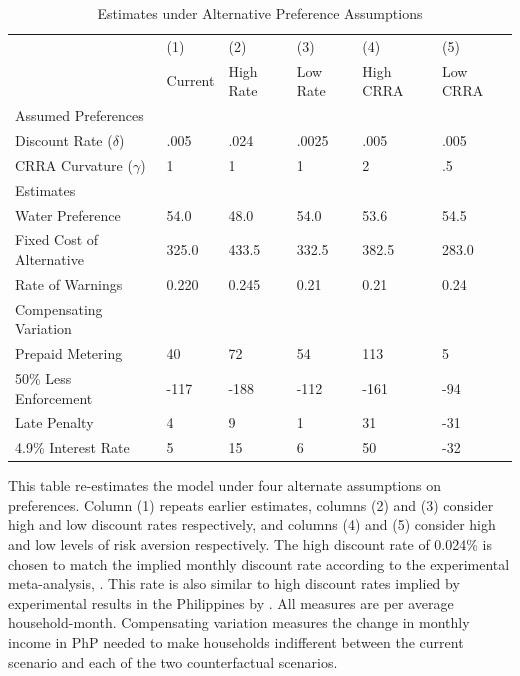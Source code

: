 \documentclass[12pt]{article}
\begin{document}
\begin{table}[H]
\centering
\caption{Estimates under Alternative Preference Assumptions}\label{table:robustestimates}
\begin{threeparttable}
\begin{tabular}{@{}l*{1}{FFFFF}@{}}
\toprule
& (1) & (2) & (3) & (4) & (5) \\
   & Current & High Rate & Low Rate & High CRRA &  Low CRRA \\[.2em]
\midrule   
Assumed Preferences\\
\hspace{1em}Discount Rate ($\delta$)  & .005  & .024 & .0025  & .005 & .005     \\
\hspace{1em}CRRA Curvature ($\gamma$)  & 1  & 1 & 1 & 2 & .5     \\[.5em]
Estimates \\
\hspace{1em}Water Preference  & 54.0 & 48.0 & 54.0 & 53.6 & 54.5 \\
\hspace{1em}Fixed Cost of Alternative  &  325.0  &  433.5  &  332.5  &  382.5  &  283.0  \\
\hspace{1em}Rate of Warnings  &  0.220 &  0.245 &  0.21 &  0.21 &  0.24 \\[.5em]
Compensating Variation \\
\hspace{1em}Prepaid Metering &  40 &  72 &  54 &  113 &  5   \\
\hspace{1em}50\% Less Enforcement & -117 & -188 & -112 & -161 & -94    \\
\hspace{1em}Late Penalty & 4 & 9 & 1 & 31 & -31    \\
\hspace{1em}4.9\% Interest Rate & 5 & 15 & 6 & 50 & -32    \\
\bottomrule
\end{tabular}
\begin{tablenotes}
\item 
\footnotesize
This table re-estimates the model under four alternate assumptions on preferences.  Column (1) repeats earlier estimates, columns (2) and (3) consider high and low discount rates respectively, and columns (4) and (5) consider high and low levels of risk aversion respectively.  The high discount rate of 0.024\% is chosen to match the implied monthly discount rate according to the experimental meta-analysis, \cite{matousek2022individual}.  This rate is also similar to high discount rates implied by experimental results in the Philippines by \cite{ashraf2006tying}.  All measures are per average household-month. Compensating variation measures the change in monthly income in PhP needed to make households indifferent between the current scenario and each of the two counterfactual scenarios.
\end{tablenotes}
\end{threeparttable}
\end{table}
\end{document}
